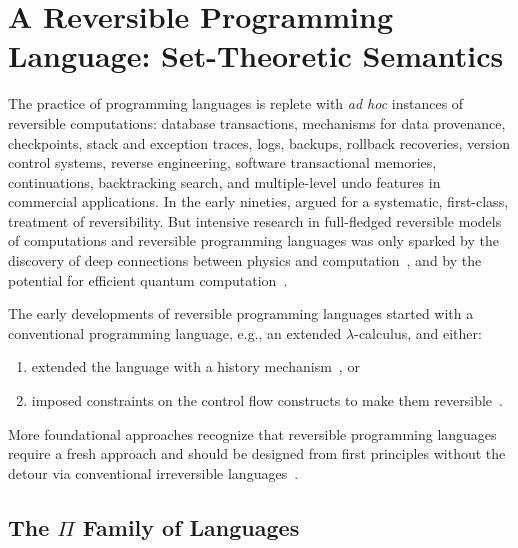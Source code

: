 \section{A Reversible Programming Language: Set-Theoretic Semantics}
\label{sec:reversibleone}
\label{sec:reversibletwo}
\label{langeqeq}

The practice of programming languages is replete with \emph{ad hoc} instances of reversible computations: database
transactions, mechanisms for data provenance, checkpoints, stack and exception traces, logs, backups, rollback
recoveries, version control systems, reverse engineering, software transactional memories, continuations, backtracking
search, and multiple-level undo features in commercial applications. In the early nineties,
\citet{Baker:1992:LLL,Baker:1992:NFT} argued for a systematic, first-class, treatment of reversibility. But intensive
research in full-fledged reversible models of computations and reversible programming languages was only sparked by the
discovery of deep connections between physics and
computation~\cite{Landauer:1961,PhysRevA.32.3266,Toffoli:1980,bennett1985fundamental,Frank:1999:REC:930275, Hey:1999:FCE:304763,fredkin1982conservative}, and by the
potential for efficient quantum computation~\cite{springerlink:10.1007/BF02650179}.

The early developments of reversible programming languages started
with a conventional programming language, e.g., an extended
$\lambda$-calculus, and either:
\begin{enumerate}
  \item extended the language with a history
        mechanism~\cite{vanTonder:2004,Kluge:1999:SEMCD,lorenz,danos2004reversible}, or
  \item imposed constraints on the control flow constructs to make them
        reversible~\cite{Yokoyama:2007:RPL:1244381.1244404}.
\end{enumerate}
More foundational approaches recognize that reversible programming languages require a fresh approach and should be
designed from first principles without the detour via conventional irreversible
languages~\cite{Yokoyama:2008:PRP,Mu:2004:ILRC,abramsky2005structural,DiPierro:2006:RCL:1166042.1166047,
  rc2011,James:2012:IE:2103656.2103667,Carette2016}.

\subsection{The $\Pi$ Family of Languages}

